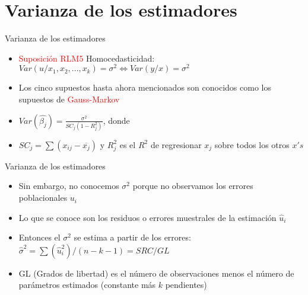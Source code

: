 \section{Varianza de los estimadores}
\begin{frame}{Varianza de los estimadores}
	\begin{itemize}
		\item \textcolor{red}{Suposición RLM5} Homocedasticidad: $Var(u/x_{1},x_{2},...,x_{k})=\sigma^{2} \Leftrightarrow Var(y/x)=\sigma^{2}$
		
		\item Los cinco supuestos hasta ahora mencionados son conocidos como los supuestos de
		\textcolor{red}{Gauss-Markov}
		
		\item $Var(\hat{\beta_{j}})=\frac{\sigma^{2}}{SC_{j}(1-R_{j}^{2})}$, donde
		\item $SC_{j}=\sum(x_{ij}-\overline{x_{j}})$ y $R_{j}^{2}$ es el $R^{2}$ de regresionar $x_{j}$ sobre todos los otros $x's$
	\end{itemize}
\end{frame}
\begin{frame}{Varianza de los estimadores}
	\begin{itemize}
		\item Sin embargo, no conocemos $\sigma^{2}$ porque no observamos los errores poblacionales $u_{i}$
		\item Lo que se conoce son los residuos o errores muestrales de la estimación $\hat{u}_{i}$
		\item Entonces el $\sigma^{2}$ se estima a partir de los errores:\\ $\hat{\sigma}^{2}=\sum(\hat u_{i}^{2})/(n-k-1)=SRC/GL$
		\item GL (Grados de libertad) es el número de observaciones menos el número de parámetros estimados (constante más $k$ pendientes)
	\end{itemize}
\end{frame}